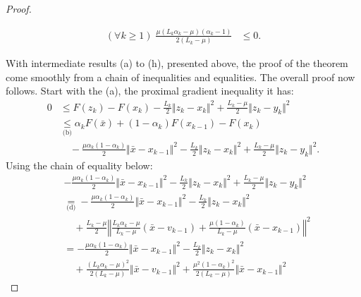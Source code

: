 \documentclass[12pt]{article}
\begin{document}
\begin{proof}
\begin{itemize}
\begin{align*}
                    (\forall k \ge 1)\; \frac{\mu(L_k\alpha_k - \mu)(\alpha_k - 1)}{2(L_k - \mu)} &\le 0.   
                \end{align*}
            \end{itemize}
            With intermediate results (a) to (h), presented above, the proof of the theorem come smoothly from a chain of inequalities and equalities. 
            The overall proof now follows. 
            Start with the (a), the proximal gradient inequality it has: 
            \begin{align*}
                0 &\le F(z_k) - F(x_k) - \frac{L_k}{2}\Vert z_k - x_k\Vert^2 + \frac{L_k - \mu}{2}\Vert z_k - y_k\Vert^2
                \\
                &\underset{\text{(b)}}{\le}
                \alpha_k F(\bar x) + (1 - \alpha_k)F(x_{k - 1}) - F(x_k) \\
                    &\quad 
                    - \frac{\mu\alpha_k(1 - \alpha_k)}{2}\Vert \bar x - x_{k - 1}\Vert^2
                    - \frac{L_k}{2}\Vert z_k - x_k\Vert^2 + \frac{L_k - \mu}{2}\Vert z_k - y_k\Vert^2. 
            \end{align*}
            Using the chain of equality below: 
            {\footnotesize
            \begin{align*}
                &- \frac{\mu\alpha_k(1 - \alpha_k)}{2}\Vert \bar x - x_{k - 1}\Vert^2
                - \frac{L_k}{2}\Vert z_k - x_k\Vert^2 + \frac{L_k - \mu}{2}\Vert z_k - y_k\Vert^2
                \\
                &\underset{\text{(d)}}{=} 
                -\frac{\mu\alpha_k(1 - \alpha_k)}{2}\Vert \bar x - x_{k - 1}\Vert^2
                - \frac{L_k}{2}\Vert z_k - x_k\Vert^2\\ 
                    &\quad +
                    \frac{L_k - \mu}{2}
                    \left\Vert 
                        \frac{L_k\alpha_k - \mu}{L_k - \mu}(\bar x - v_{k - 1}) + 
                        \frac{\mu(1 - \alpha_k)}{L_k - \mu}(\bar x - x_{k - 1})
                    \right\Vert^2
                \\
                &= 
                - \frac{\mu\alpha_k(1 - \alpha_k)}{2}\Vert \bar x - x_{k - 1}\Vert^2
                - \frac{L_k}{2}\Vert z_k - x_k\Vert^2 
                \\
                &\quad + 
                    \frac{(L_k\alpha_k - \mu)^2}{2(L_k - \mu)} \Vert \bar x - v_{k - 1}\Vert^2
                    + \frac{\mu^2(1 - \alpha_k)^2}{2(L_k - \mu)} \Vert \bar x - x_{k - 1}\Vert^2

\end{align*}}
\end{proof}
\end{document}
